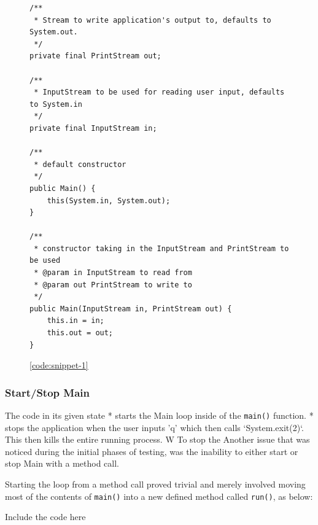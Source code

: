 \par
\begin{figure}
\begin{lstlisting}
/**
 * Stream to write application's output to, defaults to System.out.
 */
private final PrintStream out;

/**
 * InputStream to be used for reading user input, defaults to System.in
 */
private final InputStream in;

/**
 * default constructor
 */
public Main() {
    this(System.in, System.out);
}

/**
 * constructor taking in the InputStream and PrintStream to be used
 * @param in InputStream to read from
 * @param out PrintStream to write to
 */
public Main(InputStream in, PrintStream out) {
    this.in = in;
    this.out = out;
}
\end{lstlisting} 
\ref{code:snippet-1}
\end{figure}

\subsubsection{Start/Stop Main}

The code in its given state 
* starts the Main loop inside of the \lstinline{main()} function.
* stops the application when the user inputs 'q' which then calls `System.exit(2)`. This then kills the entire running process. W
To stop the 
Another issue that was noticed during the initial phases of testing, was the inability to either start or stop Main with a method call. 

Starting the loop from a method call proved trivial and merely involved moving most of the contents of \lstinline{main()} into a new defined method called \lstinline{run()}, as below: 

\begin{lstset}
Include the code here
\end{lstset} 




